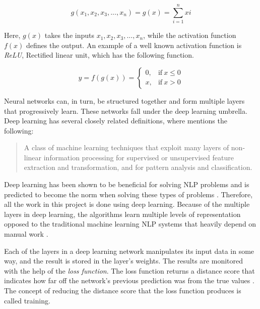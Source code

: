 \documentclass[nofilelist]{cslthse-msc}
\begin{document}
\begin{equation}
    g(x_1, x_2, x_3,...,x_n) = g(x) = \sum_{i=1}^n  xi
\end{equation}

Here, $g(x)$ takes the inputs $x_1, x_2, x_3,...,x_n$, while the activation function $f(x)$ defines the output. An example of a well known activation function is \textit{ReLU}, Rectified linear unit, which has the following function. 

\begin{equation}
y = f(g(x)) =
\begin{cases}
  0, & \text{if}\ x \leq 0 \\
  x, & \text{if}\ x > 0
\end{cases}
\end{equation}

Neural networks can, in turn, be structured together and form multiple layers that progressively learn. These networks fall under the deep learning umbrella. Deep learning has several closely related definitions, where \citet{deng2014deep} mentions the following:

\begin{quote}{A class of machine learning techniques that exploit many layers of non-linear information processing for supervised or unsupervised feature extraction and transformation, and for pattern analysis and classification.}
\end{quote}

Deep learning has been shown to be beneficial for solving NLP problems \citep{bhardwaj2018deep} and is predicted to become the norm when solving these types of problems \citep{otter2019survey}. Therefore, all the work in this project is done using deep learning. Because of the multiple layers in deep learning, the algorithms learn multiple levels of representation \citep{Hinton2007428} opposed to the traditional machine learning NLP systems that heavily depend on manual work \citep{young2018recent}. 

Each of the layers in a deep learning network manipulates its input data in some way, and the result is stored in the layer's weights. The results are monitored with the help of the \textit{loss function}. The loss function returns a distance score that indicates how far off the network's previous prediction was from the true values \citep{franoischollet2017learning}. The concept of reducing the distance score that the loss function produces is called training.
\end{document}
